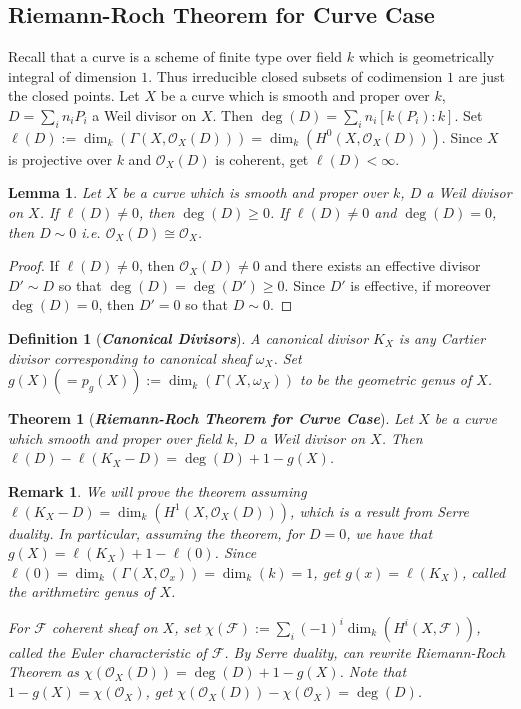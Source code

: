 \documentclass{ctexart}
\newtheorem{definition}{Definition}[section]
\newtheorem{remark}{Remark}[section]
\newtheorem{theorem}{Theorem}[section]
\newtheorem{lemma}{Lemma}[section]
\begin{document}
\subsection{Riemann-Roch Theorem for Curve Case}
Recall that a curve is a scheme of finite type over field $k$ which is geometrically integral of dimension $1$.
Thus irreducible closed subsets of codimension $1$ are just the closed points.
Let $X$ be a curve which is smooth and proper over $k$, $D = \sum_{i} n_{i}P_{i}$ a Weil divisor on $X$.
Then $\deg(D) = \sum_{i} n_{i}[k(P_{i}) : k]$.
Set $\ell(D) := \dim_{k}(\Gamma(X, \mathcal{O}_{X}(D))) = \dim_{k}(H^{0}(X, \mathcal{O}_{X}(D)))$.
Since $X$ is projective over $k$ and $\mathcal{O}_{X}(D)$ is coherent, get $\ell(D) < \infty$.
\begin{lemma}
    Let $X$ be a curve which is smooth and proper over $k$, $D$ a Weil divisor on $X$.
    If $\ell(D) \neq 0$, then $\deg(D) \ge 0$.
    If $\ell(D) \neq 0$ and $\deg(D) = 0$, then $D \sim 0$ i.e. $\mathcal{O}_{X}(D) \cong \mathcal{O}_{X}$.
    \label{Lemma 8.3}
\end{lemma}
\begin{proof}
    If $\ell(D) \neq 0$, then $\mathcal{O}_{X}(D) \neq 0$ and there exists an effective divisor $D' \sim D$ so that $\deg(D) = \deg(D') \ge 0$.
    Since $D'$ is effective, if moreover $\deg(D) = 0$, then $D' = 0$ so that $D \sim 0$.
\end{proof}
\begin{definition}[\textbf{\emph{Canonical Divisors}}]
    A canonical divisor $K_{X}$ is any Cartier divisor corresponding to canonical sheaf $\omega_{X}$.
    Set $g(X) (= p_{g}(X)) := \dim_{k}(\Gamma(X, \omega_{X}))$ to be the geometric genus of $X$.
\end{definition}
\begin{theorem}[\textbf{\emph{Riemann-Roch Theorem for Curve Case}}]
    Let $X$ be a curve which smooth and proper over field $k$, $D$ a Weil divisor on $X$.
    Then $\ell(D) - \ell(K_{X} - D) = \deg(D) + 1 - g(X)$.
    \label{Theorem 8.2}
\end{theorem}
\begin{remark}
    We will prove the theorem assuming $\ell(K_{X} - D) = \dim_{k}(H^{1}(X, \mathcal{O}_{X}(D)))$, which is a result from Serre duality.
    In particular, assuming the theorem, for $D = 0$, we have that $g(X) = \ell(K_{X}) + 1 - \ell(0)$.
    Since $\ell(0) = \dim_{k}(\Gamma(X, \mathcal{O}_{x})) = \dim_{k}(k) = 1$, get $g(x) = \ell(K_{X})$, called the arithmetirc genus of $X$.
    \par
    For $\mathcal{F}$ coherent sheaf on $X$, set $\chi(\mathcal{F}) := \sum_{i} (-1)^{i}\dim_{k}(H^{i}(X, \mathcal{F}))$, called the Euler characteristic of $\mathcal{F}$.
    By Serre duality, can rewrite Riemann-Roch Theorem as $\chi(\mathcal{O}_{X}(D)) = \deg(D) + 1 - g(X)$.
    Note that $1 - g(X) = \chi(\mathcal{O}_{X})$, get $\chi(\mathcal{O}_{X}(D)) - \chi(\mathcal{O}_{X}) = \deg(D)$.
\end{remark}
\end{document}
